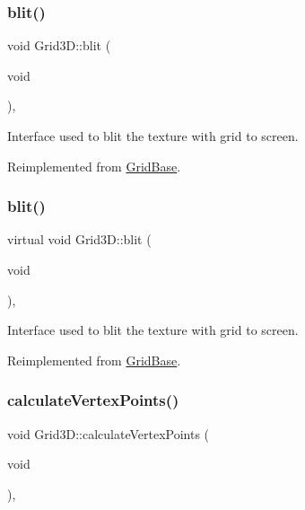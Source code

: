 \subsubsection{\texorpdfstring{blit()}{blit()}\hspace{0.1cm}{\footnotesize\ttfamily [1/2]}}
{\footnotesize\ttfamily void Grid3\+D\+::blit (\begin{DoxyParamCaption}\item[{void}]{ }\end{DoxyParamCaption})\hspace{0.3cm}{\ttfamily [override]}, {\ttfamily [virtual]}}

Interface used to blit the texture with grid to screen. 

Reimplemented from \hyperlink{classGridBase_af0d708ad2c3be26a6b74e27ec732b543}{Grid\+Base}.

\mbox{\label{classGrid3D_af09d4f416ea51976f1ab19688716b3b2}} 
\subsubsection{\texorpdfstring{blit()}{blit()}\hspace{0.1cm}{\footnotesize\ttfamily [2/2]}}
{\footnotesize\ttfamily virtual void Grid3\+D\+::blit (\begin{DoxyParamCaption}\item[{void}]{ }\end{DoxyParamCaption})\hspace{0.3cm}{\ttfamily [override]}, {\ttfamily [virtual]}}

Interface used to blit the texture with grid to screen. 

Reimplemented from \hyperlink{classGridBase_af0d708ad2c3be26a6b74e27ec732b543}{Grid\+Base}.

\mbox{\label{classGrid3D_a6b2a8e963e37df0c9deddb34f7c3a1ae}} 
\subsubsection{\texorpdfstring{calculate\+Vertex\+Points()}{calculateVertexPoints()}\hspace{0.1cm}{\footnotesize\ttfamily [1/2]}}
{\footnotesize\ttfamily void Grid3\+D\+::calculate\+Vertex\+Points (\begin{DoxyParamCaption}\item[{void}]{ }\end{DoxyParamCaption})\hspace{0.3cm}{\ttfamily [override]}, {\ttfamily [virtual]}}

